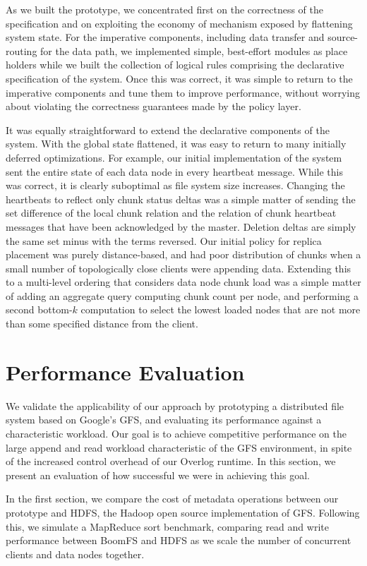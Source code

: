\documentclass[twocolumn]{article}
\begin{document}
As we built the prototype, we concentrated first on the correctness of
the specification and on exploiting the economy of mechanism exposed
by flattening system state.  For the imperative components, including
data transfer and source-routing for the data path, we implemented
simple, best-effort modules as place holders while we built the
collection of logical rules comprising the declarative specification
of the system.  Once this was correct, it was simple to return to the
imperative components and tune them to improve performance, without
worrying about violating the correctness guarantees made by the policy
layer.

It was equally straightforward to extend the declarative components of
the system.  With the global state flattened, it was easy to return to
many initially deferred optimizations.  For example, our initial
implementation of the system sent the entire state of each data node
in every heartbeat message. While this was correct, it is clearly
suboptimal as file system size increases.  Changing the heartbeats to
reflect only chunk status deltas was a simple matter of sending the
set difference of the local chunk relation and the relation of chunk
heartbeat messages that have been acknowledged by the master.
Deletion deltas are simply the same set minus with the terms reversed.
Our initial policy for replica placement was purely distance-based,
and had poor distribution of chunks when a small number of
topologically close clients were appending data.  Extending this to a
multi-level ordering that considers data node chunk load was a simple
matter of adding an aggregate query computing chunk count per node,
and performing a second bottom-$k$ computation to select the lowest
loaded nodes that are not more than some specified distance from the
client.

\section{Performance Evaluation}
\label{perf-eval}
We validate the applicability of our approach by prototyping a
distributed file system based on Google's GFS, and evaluating its
performance against a characteristic workload.  Our goal is to achieve
competitive performance on the large append and read workload
characteristic of the GFS environment, in spite of the increased
control overhead of our Overlog runtime.  In this section, we
present an evaluation of how successful we were in achieving this
goal.

In the first section, we compare the cost of metadata operations
between our prototype and HDFS, the Hadoop open source implementation
of GFS.  Following this, we simulate a MapReduce sort benchmark,
comparing read and write performance between BoomFS and HDFS as we scale
the number of concurrent clients and data nodes together.
\end{document}
